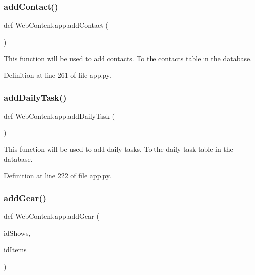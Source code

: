 \subsubsection{\texorpdfstring{add\+Contact()}{addContact()}}
{\footnotesize\ttfamily def Web\+Content.\+app.\+add\+Contact (\begin{DoxyParamCaption}{ }\end{DoxyParamCaption})}

\begin{DoxyVerb}This function will be used to add contacts.
To the contacts table in the database. 
\end{DoxyVerb}
 

Definition at line 261 of file app.\+py.

\mbox{\label{namespace_web_content_1_1app_a74ab25eca92d4f0315c1920a1101f366}} 
\subsubsection{\texorpdfstring{add\+Daily\+Task()}{addDailyTask()}}
{\footnotesize\ttfamily def Web\+Content.\+app.\+add\+Daily\+Task (\begin{DoxyParamCaption}{ }\end{DoxyParamCaption})}

\begin{DoxyVerb}This function will be used to add daily tasks.
To the daily task table in the database. 
\end{DoxyVerb}
 

Definition at line 222 of file app.\+py.

\mbox{\label{namespace_web_content_1_1app_a52178c26cbe8ed1b16427622b4dc1165}} 
\subsubsection{\texorpdfstring{add\+Gear()}{addGear()}}
{\footnotesize\ttfamily def Web\+Content.\+app.\+add\+Gear (\begin{DoxyParamCaption}\item[{}]{id\+Shows,  }\item[{}]{id\+Items }\end{DoxyParamCaption})}

